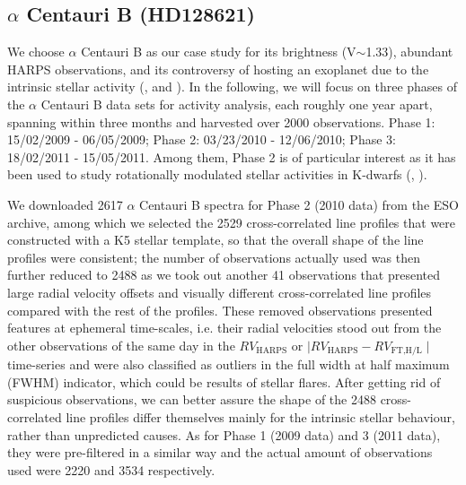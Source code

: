 \subsection{$\alpha$ Centauri B (HD128621)}

We choose $\alpha$ Centauri B as our case study for its brightness (V$\sim$1.33), abundant HARPS observations, and its controversy of hosting an exoplanet due to the intrinsic stellar activity (\cite{Dumusque_Centauri_B}, \cite{Hatzes2013} and \cite{Rajpaul_Alpha_Cen_B}). In the following, we will focus on three phases of the $\alpha$ Centauri B data sets for activity analysis, each roughly one year apart, spanning within three months and harvested over 2000 observations. Phase 1: 15/02/2009 - 06/05/2009; Phase 2: 03/23/2010 - 12/06/2010; Phase 3: 18/02/2011 - 15/05/2011. Among them, Phase 2 is of particular interest as it has been used to study rotationally modulated stellar activities in K-dwarfs (\cite{Thompson2017MNRAS}, \cite{Wise2018}). 

We downloaded 2617 $\alpha$ Centauri B spectra for Phase 2 (2010 data) from the ESO archive, among which we selected the 2529 cross-correlated line profiles that were constructed with a K5 stellar template, so that the overall shape of the line profiles were consistent; the number of observations actually used was then further reduced to 2488 as we took out another 41 observations that presented large radial velocity offsets and visually different cross-correlated line profiles compared with the rest of the profiles. These removed observations presented features at ephemeral time-scales, i.e. their radial velocities stood out from the other observations of the same day in the $RV_\text{HARPS}$ or $\mid RV_\text{HARPS} - RV_\text{FT,H/L}\mid$ time-series and were also classified as outliers in the full width at half maximum (FWHM) indicator, which could be results of stellar flares. After getting rid of suspicious observations, we can better assure the shape of the 2488 cross-correlated line profiles differ themselves mainly for the intrinsic stellar behaviour, rather than unpredicted causes. As for Phase 1 (2009 data) and 3 (2011 data), they were pre-filtered in a similar way and the actual amount of observations used were 2220 and 3534 respectively.

